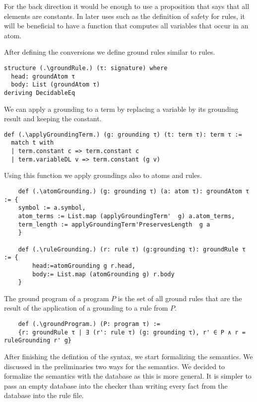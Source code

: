 For the back direction it would be enough to use a proposition that says that all elements are constants. In later uses such as the definition of safety for rules, it will be beneficial to have a function that computes all variables that occur in an atom. 



After defining the conversions we define ground rules similar to rules.

\begin{lstlisting}
structure (.\groundRule.) (τ: signature) where
  head: groundAtom τ
  body: List (groundAtom τ)
deriving DecidableEq
\end{lstlisting}

We can apply a grounding to a term by replacing a variable by its grounding result and keeping the constant.
\begin{lstlisting}
def (.\applyGroundingTerm.) (g: grounding τ) (t: term τ): term τ :=
  match t with
  | term.constant c => term.constant c
  | term.variableDL v => term.constant (g v)
\end{lstlisting}

Using this function we apply groundings also to atoms and rules. 

\begin{lstlisting}
    def (.\atomGrounding.) (g: grounding τ) (a: atom τ): groundAtom τ := {
    symbol := a.symbol, 
    atom_terms := List.map (applyGroundingTerm'  g) a.atom_terms, 
    term_length := applyGroundingTerm'PreservesLength  g a
    }

    def (.\ruleGrounding.) (r: rule τ) (g:grounding τ): groundRule τ := {
        head:=atomGrounding g r.head, 
        body:= List.map (atomGrounding g) r.body 
    }

\end{lstlisting}

The ground program of a program $P$ is the set of all ground rules that are the result of the application of a grounding to a rule from $P$.

\begin{lstlisting}
    def (.\groundProgram.) (P: program τ) := 
    {r: groundRule τ | ∃ (r': rule τ) (g: grounding τ), r' ∈ P ∧ r = ruleGrounding r' g}
\end{lstlisting}

After finishing the defintion of the syntax, we start formalizing the semantics. We discussed in the preliminaries two ways for the semantics. We decided to formalize the semantics with the database as this is more general. It is simpler to pass an empty database into the checker than writing every fact from the database into the rule file.

